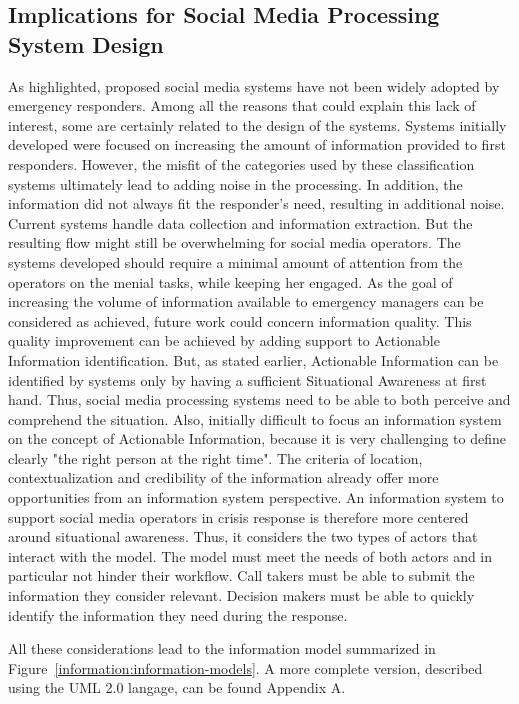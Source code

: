 \subsection{Implications for Social Media Processing System Design}
As \textcite{zadeSituationalAwarenessActionability2018} highlighted, proposed social media systems have not been widely adopted by emergency responders.
Among all the reasons that could explain this lack of interest, some are certainly related to the design of the systems.
Systems initially developed were focused on increasing the amount of information provided to first responders.
However, the misfit of the categories used by these classification systems ultimately lead to adding noise in the processing.
In addition, the information did not always fit the responder's need, resulting in additional noise.
Current systems handle data collection and information extraction.
But the resulting flow might still be overwhelming for social media operators.
The systems developed should require a minimal amount of attention from the operators on the menial tasks, while keeping her engaged.
As the goal of increasing the volume of information available to emergency managers can be considered as achieved, future work could concern information quality.
This quality improvement can be achieved by adding support to Actionable Information identification.
But, as stated earlier, Actionable Information can be identified by systems only by having a sufficient Situational Awareness at first hand.
Thus, social media processing systems need to be able to both perceive and comprehend the situation.
Also, initially difficult to focus an information system on the concept of Actionable Information,
because it is very challenging to define clearly "the right person at the right time".
The criteria of location, contextualization and credibility of the information already offer more opportunities from an information system perspective.
An information system to support social media operators in crisis response is therefore more centered around situational awareness.
Thus, it considers the two types of actors that interact with the model.
The model must meet the needs of both actors and in particular not hinder their workflow.
Call takers must be able to submit the information they consider relevant.
Decision makers must be able to quickly identify the information they need during the response.

All these considerations lead to the information model summarized in Figure~\ref{information:information-models}.
A more complete version, described using the UML 2.0 langage, can be found Appendix A.

